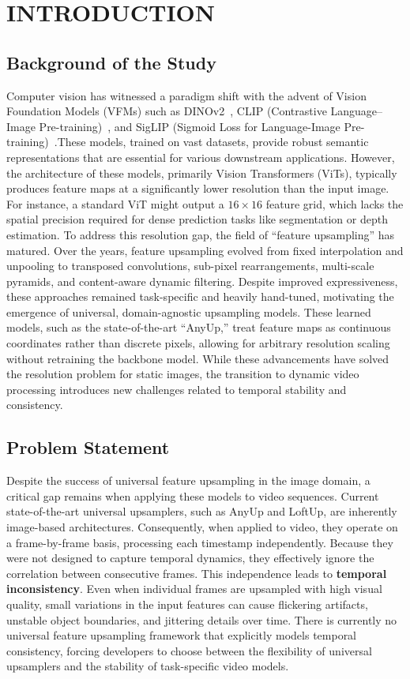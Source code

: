 \chapter{INTRODUCTION}

\section{Background of the Study}
Computer vision has witnessed a paradigm shift with the advent of Vision Foundation Models (VFMs) such as DINOv2~\cite{dinov2}, CLIP (Contrastive Language--Image Pre-training)~\cite{radford2021clip}, and SigLIP (Sigmoid Loss for Language-Image Pre-training)~\cite{zhai2023siglip}\@.\@ These models, trained on vast datasets, provide robust semantic representations that are essential for various downstream applications. However, the architecture of these models, primarily Vision Transformers (ViTs), typically produces feature maps at a significantly lower resolution than the input image. For instance, a standard ViT might output a $16\times16$ feature grid, which lacks the spatial precision required for dense prediction tasks like segmentation or depth estimation.
To address this resolution gap, the field of ``feature upsampling'' has matured. Over the years, feature upsampling evolved from fixed interpolation and unpooling to transposed convolutions, sub-pixel rearrangements, multi-scale pyramids, and content-aware dynamic filtering. Despite improved expressiveness, these approaches remained task-specific and heavily hand-tuned, motivating the emergence of universal, domain-agnostic upsampling models. These learned models, such as the state-of-the-art ``AnyUp,'' treat feature maps as continuous coordinates rather than discrete pixels, allowing for arbitrary resolution scaling without retraining the backbone model. While these advancements have solved the resolution problem for static images, the transition to dynamic video processing introduces new challenges related to temporal stability and consistency.

\section{Problem Statement}
Despite the success of universal feature upsampling in the image domain, a critical gap remains when applying these models to video sequences. Current state-of-the-art universal upsamplers, such as AnyUp and LoftUp, are inherently image-based architectures. Consequently, when applied to video, they operate on a frame-by-frame basis, processing each timestamp independently. Because they were not designed to capture temporal dynamics, they effectively ignore the correlation between consecutive frames. This independence leads to \textbf{temporal inconsistency}. Even when individual frames are upsampled with high visual quality, small variations in the input features can cause flickering artifacts, unstable object boundaries, and jittering details over time. There is currently no universal feature upsampling framework that explicitly models temporal consistency, forcing developers to choose between the flexibility of universal upsamplers and the stability of task-specific video models.

